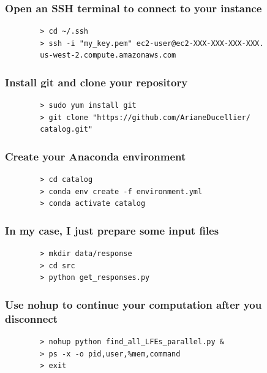 \documentclass{beamer}
\begin{document}
	\begin{frame}[fragile]
	\frametitle{Open an SSH terminal to connect to your instance}
	\begin{exampleblock}{}
		\begin{verbatim}
		> cd ~/.ssh
		> ssh -i "my_key.pem" ec2-user@ec2-XXX-XXX-XXX-XXX.
		us-west-2.compute.amazonaws.com
		\end{verbatim}
	\end{exampleblock}
	\end{frame}

	\begin{frame}[fragile]
	\frametitle{Install git and clone your repository}
	\begin{exampleblock}{}
		\begin{verbatim}
		> sudo yum install git
		> git clone "https://github.com/ArianeDucellier/
		catalog.git"
		\end{verbatim}
	\end{exampleblock}
	\end{frame}

	\begin{frame}[fragile]
	\frametitle{Create your Anaconda environment}
	\begin{exampleblock}{}
		\begin{verbatim}
		> cd catalog
		> conda env create -f environment.yml
		> conda activate catalog
		\end{verbatim}
	\end{exampleblock}
	\end{frame}

	\begin{frame}[fragile]
	\frametitle{In my case, I just prepare some input files}
	\begin{exampleblock}{}
		\begin{verbatim}
		> mkdir data/response
		> cd src
		> python get_responses.py
		\end{verbatim}
	\end{exampleblock}
	\end{frame}

	\begin{frame}[fragile]
	\frametitle{Use nohup to continue your computation after you disconnect}
	\begin{exampleblock}{}
		\begin{verbatim}
		> nohup python find_all_LFEs_parallel.py &
		> ps -x -o pid,user,%mem,command
		> exit
		\end{verbatim}
	\end{exampleblock}
	\end{frame}
\end{document}
